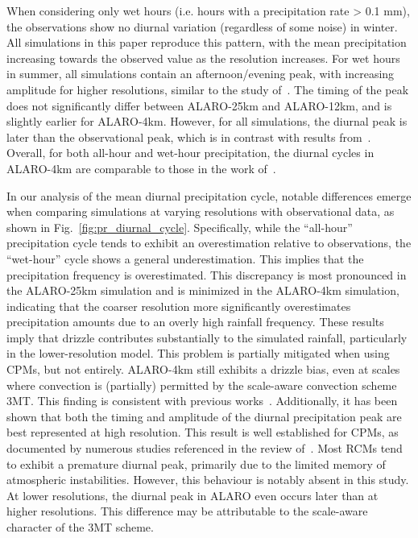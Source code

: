 \documentclass[journal abbreviation, manuscript]{copernicus}
\begin{document}
When considering only wet hours (i.e. hours with a precipitation rate > 0.1 mm), the observations show no diurnal variation (regardless of some noise) in winter. 
All simulations in this paper reproduce this pattern, with the mean precipitation increasing towards the observed value as the resolution increases.
For wet hours in summer, all simulations contain an afternoon/evening peak, with increasing amplitude for higher resolutions, similar to the study of~\citet{de_troch_application_2016}. 
The timing of the peak does not significantly differ between ALARO-25km and ALARO-12km, and is slightly earlier for ALARO-4km. 
However, for all simulations, the diurnal peak is later than the observational peak, which is in contrast with results from~\citet{de_troch_application_2016}. 
Overall, for both all-hour and wet-hour precipitation, the diurnal cycles in ALARO-4km are comparable to those in the work of~\citet{de_troch_application_2016}.

In our analysis of the mean diurnal precipitation cycle, notable differences emerge when comparing simulations at varying resolutions with observational data, as shown in Fig.~\ref{fig:pr_diurnal_cycle}. 
Specifically, while the ``all-hour'' precipitation cycle tends to exhibit an overestimation relative to observations, the ``wet-hour'' cycle shows a general underestimation.
This implies that the precipitation frequency is overestimated. 
This discrepancy is most pronounced in the ALARO-25km simulation and is minimized in the ALARO-4km simulation, indicating that the coarser resolution more significantly overestimates precipitation amounts due to an overly high rainfall frequency. 
These results imply that drizzle contributes substantially to the simulated rainfall, particularly in the lower-resolution model.
This problem is partially mitigated when using CPMs, but not entirely.
ALARO-4km still exhibits a drizzle bias, even at scales where convection is (partially) permitted by the scale-aware convection scheme 3MT.
This finding is consistent with previous works~\citep{kendon_realism_2012, fosser_benefit_2015, berthou_pan-european_2020}.
Additionally, it has been shown that both the timing and amplitude of the diurnal precipitation peak are best represented at high resolution. 
This result is well established for CPMs, as documented by numerous studies referenced in the review of~\citet{lucas-picher_convection-permitting_2021}. 
Most RCMs tend to exhibit a premature diurnal peak, primarily due to the limited memory of atmospheric instabilities. 
However, this behaviour is notably absent in this study. 
At lower resolutions, the diurnal peak in ALARO even occurs later than at higher resolutions. 
This difference may be attributable to the scale-aware character of the 3MT scheme. 
\end{document}
